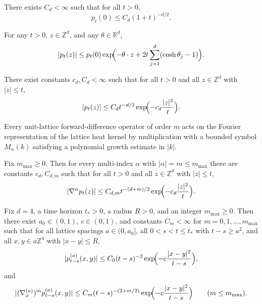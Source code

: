 \begin{lemma}
There exists $C_d<\infty$ such that for all $t>0$,
\[
p_t(0)\le C_d (1+t)^{-d/2}.
\]
\end{lemma}

\begin{lemma}
For any $t>0$, $z\in\mathbb Z^d$, and any $\theta\in\mathbb R^d$,
\[
|p_t(z)|\le p_t(0)
\exp\!\Bigl(-\theta\cdot z + 2t\sum_{j=1}^d(\cosh\theta_j-1)\Bigr).
\]
\end{lemma}

\begin{proposition}
There exist constants $c_d,C_d<\infty$ such that for all $t>0$ and all $z\in\mathbb Z^d$ with $|z|\le t$,
\[
|p_t(z)|\le C_d t^{-d/2}\exp\!\Bigl(-c_d\frac{|z|^2}{t}\Bigr).
\]
\end{proposition}

\begin{lemma}
Every unit-lattice forward-difference operator of order $m$ acts on the Fourier representation of the lattice heat kernel by multiplication with a bounded symbol $M_\alpha(k)$ satisfying a polynomial growth estimate in $|k|$.
\end{lemma}

\begin{proposition}
Fix $m_{\max}\ge 0$. Then for every multi-index $\alpha$ with $|\alpha|=m\le m_{\max}$ there are constants $c_d,C_{d,m}$ such that for all $t>0$ and all $z\in\mathbb Z^d$ with $|z|\le t$,
\[
|\nabla^\alpha p_t(z)|\le C_{d,m} t^{-(d+m)/2}\exp\!\Bigl(-c_d\frac{|z|^2}{t}\Bigr).
\]
\end{proposition}

\begin{theorem}
Fix $d=4$, a time horizon $t_\ast>0$, a radius $R>0$, and an integer $m_{\max}\ge 0$. Then there exist $a_0\in(0,1)$, $c\in(0,1)$, and constants $C_m<\infty$ for $m=0,1,\dots,m_{\max}$ such that for all lattice spacings $a\in(0,a_0]$, all $0<s<t\le t_\ast$ with $t-s\ge a^2$, and all $x,y\in a\mathbb Z^4$ with $|x-y|\le R$,
\[
|p_{t-s}^{(a)}(x,y)|\le C_0 (t-s)^{-2}\exp\!\Bigl(-c\frac{|x-y|^2}{t-s}\Bigr),
\]
and
\[
|(\nabla^{(a)}_{x})^m p_{t-s}^{(a)}(x,y)|
\le C_m (t-s)^{-(2+m/2)}\exp\!\Bigl(-c\frac{|x-y|^2}{t-s}\Bigr)
\qquad (m\le m_{\max}).
\]
\end{theorem}

